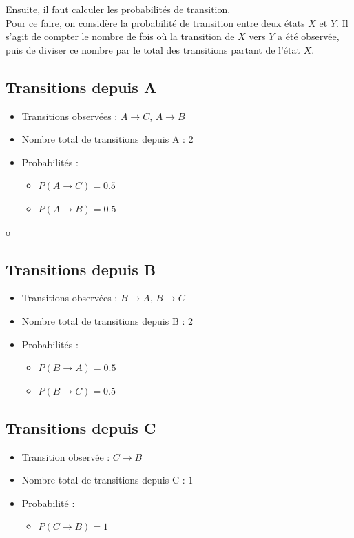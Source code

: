 \documentclass[a4paper, 11pt]{report}
\begin{document}
Ensuite, il faut calculer les probabilités de transition. \\
Pour ce faire, on considère la probabilité de transition entre deux états \(X\) et \(Y\). Il s'agit de compter le nombre de fois où la transition de \(X\) vers \(Y\) a été observée, puis de diviser ce nombre par le total des transitions partant de l'état \(X\).

\subsection*{Transitions depuis A}
\begin{itemize}
    \item Transitions observées : \( A \rightarrow C \), \( A \rightarrow B \)
    \item Nombre total de transitions depuis A : \(2\)
    \item Probabilités :
    \begin{itemize}
        \item \( P(A \rightarrow C)  = 0.5 \)
        \item \( P(A \rightarrow B)  = 0.5 \)
    \end{itemize}
\end{itemize}o

\subsection*{Transitions depuis B}
\begin{itemize}
    \item Transitions observées : \( B \rightarrow A \), \( B \rightarrow C \)
    \item Nombre total de transitions depuis B : \(2\)
    \item Probabilités :
    \begin{itemize}
        \item \( P(B \rightarrow A) = 0.5 \)
        \item \( P(B \rightarrow C) = 0.5 \)
    \end{itemize}
\end{itemize}

\subsection*{Transitions depuis C}
\begin{itemize}
    \item Transition observée : \( C \rightarrow B \)
    \item Nombre total de transitions depuis C : \(1\)
    \item Probabilité :
    \begin{itemize}
        \item \( P(C \rightarrow B) = 1 \)
    \end{itemize}
\end{itemize}
\end{document}

